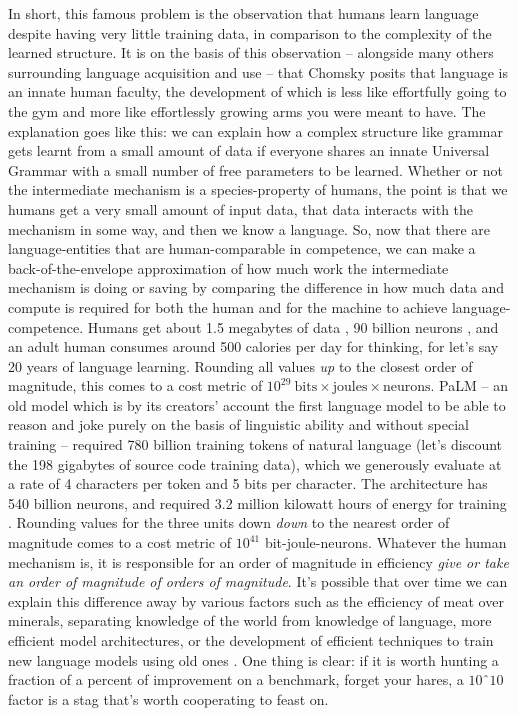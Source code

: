 \begin{fullwidth}
In short, this famous problem is the observation that humans learn language despite having very little training data, in comparison to the complexity of the learned structure. It is on the basis of this observation -- alongside many others surrounding language acquisition and use -- that Chomsky posits \citep{chomsky_new_2000} that language is an innate human faculty, the development of which is less like effortfully going to the gym and more like effortlessly growing arms you were meant to have. The explanation goes like this: we can explain how a complex structure like grammar gets learnt from a small amount of data if everyone shares an innate Universal Grammar with a small number of free parameters to be learned. Whether or not the intermediate mechanism is a species-property of humans, the point is that we humans get a very small amount of input data, that data interacts with the mechanism in some way, and then we know a language. So, now that there are language-entities that are human-comparable in competence, we can make a back-of-the-envelope approximation of how much work the intermediate mechanism is doing or saving by comparing the difference in how much data and compute is required for both the human and for the machine to achieve language-competence. Humans get about 1.5 megabytes of data \citep{mollica_humans_2019}, 90 billion neurons \citep{herculano-houzel_remarkable_2012}, and an adult human consumes around 500 calories per day for thinking, for let's say 20 years of language learning. Rounding all values \emph{up} to the closest order of magnitude, this comes to a cost metric of $10^{29} \ \text{bits} \times \text{joules} \times \text{neurons}$. PaLM -- an old model which is by its creators' account the first language model to be able to reason and joke purely on the basis of linguistic ability and without special training \citep{chowdhery_palm_2022,narang_pathways_2022} -- required 780 billion training tokens of natural language (let's discount the 198 gigabytes of source code training data), which we generously evaluate at a rate of 4 characters per token \citep{khan_what_2023} and 5 bits per character. The architecture has 540 billion neurons, and required 3.2 million kilowatt hours of energy for training \citep{tom_goldstein_tomgoldsteincs_training_2022}. Rounding values for the three units down \emph{down} to the nearest order of magnitude comes to a cost metric of $10^{41}$ bit-joule-neurons. Whatever the human mechanism is, it is responsible for an order of magnitude in efficiency \emph{give or take an order of magnitude of orders of magnitude}. It's possible that over time we can explain this difference away by various factors such as the efficiency of meat over minerals, separating knowledge of the world from knowledge of language, more efficient model architectures, or the development of efficient techniques to train new language models using old ones \citep{}. One thing is clear: if it is worth hunting a fraction of a percent of improvement on a benchmark, forget your hares, a $10ˆ10$ factor is a stag that's worth cooperating to feast on.\\


\end{fullwidth}
